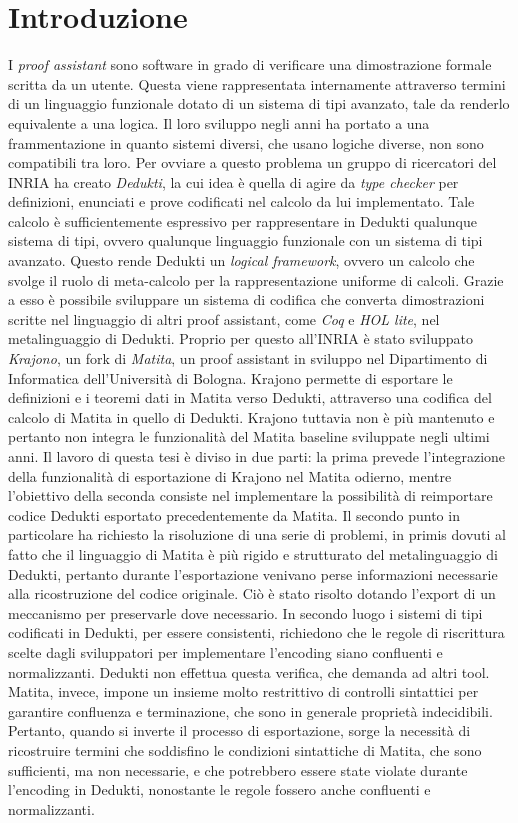 \documentclass[12pt,a4paper]{report}
\begin{document}
\chapter*{Introduzione}
I \textit{proof assistant} sono software in grado di verificare una dimostrazione
formale scritta da un utente. Questa viene rappresentata internamente attraverso 
termini di un linguaggio funzionale dotato di un sistema di tipi avanzato, tale
da renderlo equivalente a una logica. Il loro sviluppo negli anni ha portato a una frammentazione
in quanto sistemi diversi, che usano logiche diverse, non sono compatibili tra 
loro. Per ovviare a questo problema un gruppo di ricercatori del INRIA ha creato
\textit{Dedukti}, la cui idea è quella di agire da \textit{type checker} per definizioni, enunciati e prove codificati
nel calcolo da lui implementato. Tale calcolo è sufficientemente espressivo 
per rappresentare in Dedukti qualunque sistema di tipi, ovvero qualunque linguaggio
funzionale con un sistema di tipi avanzato. Questo rende Dedukti un \textit{logical 
framework}, ovvero un calcolo che svolge il ruolo di meta-calcolo per la rappresentazione
uniforme di calcoli. Grazie a esso è possibile sviluppare un sistema di codifica che
converta dimostrazioni scritte nel linguaggio di altri proof assistant, come \textit{Coq} e \textit{HOL lite},
nel metalinguaggio di Dedukti. Proprio per questo all'INRIA è stato sviluppato \textit{Krajono}, un
fork di \textit{Matita}, un proof assistant in sviluppo nel Dipartimento 
di Informatica dell'Università di Bologna. Krajono permette di esportare le definizioni
e i teoremi dati in Matita verso Dedukti, attraverso una codifica del calcolo
di Matita in quello di Dedukti. Krajono tuttavia non è più mantenuto e pertanto non integra
le funzionalità del Matita baseline sviluppate negli ultimi anni. 
Il lavoro di questa tesi è diviso in due parti: la prima prevede l'integrazione della 
funzionalità di esportazione di Krajono nel Matita odierno, mentre l'obiettivo della seconda
consiste nel implementare la possibilità di reimportare
codice Dedukti esportato precedentemente da Matita. Il secondo punto in particolare 
ha richiesto la risoluzione di una serie di problemi, in primis dovuti al fatto che
il linguaggio di Matita è più rigido e strutturato del metalinguaggio di Dedukti,
pertanto durante l'esportazione venivano perse informazioni necessarie alla
ricostruzione del codice originale. Ciò è stato risolto dotando l'export di
un meccanismo per preservarle dove necessario. In secondo luogo i sistemi di tipi
codificati in Dedukti, per essere consistenti, richiedono che le regole di riscrittura
scelte dagli sviluppatori per implementare l'encoding siano confluenti e normalizzanti.
Dedukti non effettua questa verifica, che demanda ad altri tool. Matita, invece, impone
un insieme molto restrittivo di controlli sintattici per garantire confluenza e terminazione,
che sono in generale proprietà indecidibili. Pertanto, quando si inverte il processo di
esportazione, sorge la necessità di ricostruire termini che soddisfino le condizioni 
sintattiche di Matita, che sono sufficienti, ma non necessarie, e che potrebbero essere
state violate durante l'encoding in Dedukti, nonostante le regole fossero anche confluenti
e normalizzanti.
\end{document}

